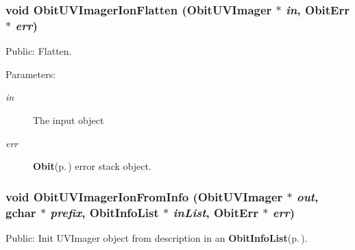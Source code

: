 \subsubsection{\setlength{\rightskip}{0pt plus 5cm}void Obit\-UVImager\-Ion\-Flatten ({\bf Obit\-UVImager} $\ast$ {\em in}, {\bf Obit\-Err} $\ast$ {\em err})}\label{ObitUVImagerIon_8c_a15}


Public: Flatten. 

\begin{Desc}
\item[Parameters:]
\begin{description}
\item[{\em in}]The input object \item[{\em err}]{\bf Obit}{\rm (p.\,\pageref{structObit})} error stack object. \end{description}
\end{Desc}
\subsubsection{\setlength{\rightskip}{0pt plus 5cm}void Obit\-UVImager\-Ion\-From\-Info ({\bf Obit\-UVImager} $\ast$ {\em out}, gchar $\ast$ {\em prefix}, {\bf Obit\-Info\-List} $\ast$ {\em in\-List}, {\bf Obit\-Err} $\ast$ {\em err})}\label{ObitUVImagerIon_8c_a7}


Public: Init UVImager object from description in an {\bf Obit\-Info\-List}{\rm (p.\,\pageref{structObitInfoList})}. 

